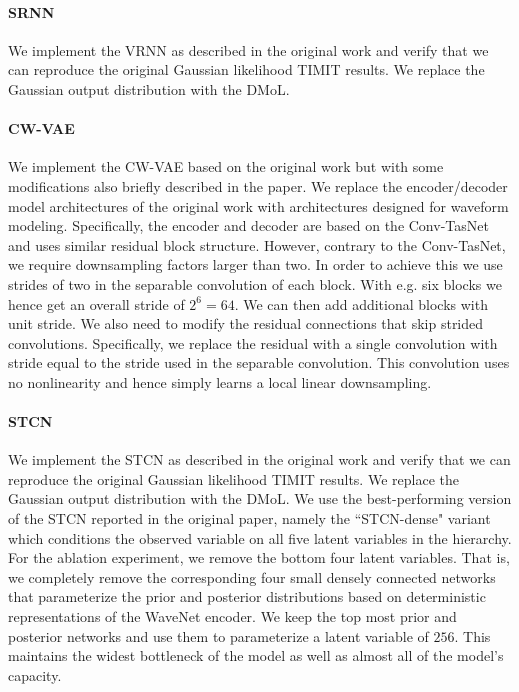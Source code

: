 {\paragraph{SRNN}
We implement the VRNN as described in the original work \parencite{fraccaro_sequential_2016} and verify that we can reproduce the original Gaussian likelihood TIMIT results. We replace the Gaussian output distribution with the DMoL. 

\paragraph{CW-VAE} We implement the CW-VAE based on the original work \parencite{saxena_clockwork_2021} but with some modifications also briefly described in the paper. We replace the encoder/decoder model architectures of the original work with architectures designed for waveform modeling. Specifically, the encoder and decoder are based on the Conv-TasNet \parencite{luo_conv-tasnet_2019} and uses similar residual block structure. However, contrary to the Conv-TasNet, we require downsampling factors larger than two. In order to achieve this we use strides of two in the separable convolution of each block. With e.g. six blocks we hence get an overall stride of $2^6=64$. We can then add additional blocks with unit stride.
We also need to modify the residual connections that skip strided convolutions. Specifically, we replace the residual with a single convolution with stride equal to the stride used in the separable convolution. This convolution uses no nonlinearity and hence simply learns a local linear downsampling.

\paragraph{STCN} We implement the STCN as described in the original work \parencite{aksan_stcn_2019} and verify that we can reproduce the original Gaussian likelihood TIMIT results. We replace the Gaussian output distribution with the DMoL. We use the best-performing version of the STCN reported in the original paper, namely the ``STCN-dense" variant which conditions the observed variable on all five latent variables in the hierarchy. For the ablation experiment, we remove the bottom four latent variables. That is, we completely remove the corresponding four small densely connected networks that parameterize the prior and posterior distributions based on deterministic representations of the WaveNet encoder. We keep the top most prior and posterior networks and use them to parameterize a latent variable of $256$. This maintains the widest bottleneck of the model as well as almost all of the model's capacity.

}
